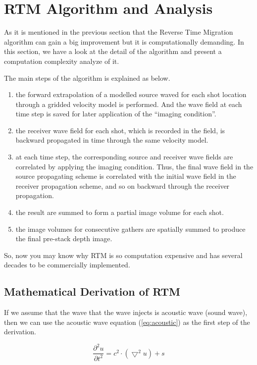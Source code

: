 \section{RTM Algorithm and Analysis}

As it is mentioned in the previous section that the Reverse Time Migration
algorithm can gain a big improvement but it is computationally demanding.
In this section, we have a look at the detail of the algorithm and present
a computation complexity analyze of it.

The main steps of the algorithm is explained as below\cite{rtm}.

\begin{enumerate}
\item the forward extrapolation of a modelled source waved for each shot
  location through a gridded velocity model is performed. And the wave
  field at each time step is saved for later application of the ``imaging
  condition''.
\item the receiver wave field for each shot, which is recorded in the
  field, is backward propagated in time through the same velocity model.
\item at each time step, the corresponding source and receiver wave fields
  are correlated by applying the imaging condition. Thus, the final
  wave field in the source propagating scheme is correlated with the
  initial wave field in the receiver propagation scheme, and so on backward
  through the receiver propagation.
\item the result are summed to form a partial image volume for each shot.
\item the image volumes for consecutive gathers are spatially summed to
  produce the final pre-stack depth image.
\end{enumerate}

So, now you may know why RTM is so computation expensive and has several
decades to be commercially implemented.

\subsection{Mathematical Derivation of RTM}

If we assume that the wave that the wave injects is acoustic wave (sound
wave), then we can use the acoustic wave equation (\ref{eq:acoustic}) as
the first step of the derivation.

\begin{equation}
  \frac{\partial ^2u}{\partial t^2}=c^2 \cdot \left(  \bigtriangledown ^2u \right) +s
  \label{eq:acoustic}
\end{equation}

